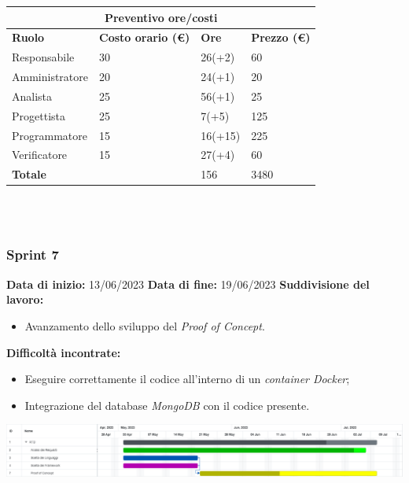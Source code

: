 \documentclass[a4paper, 12pt]{article}
\begin{document}
\begin{center}
	\begin{tabularx}{\textwidth}{|X|X|X|X|}
		\hline
		\multicolumn{4}{|c|}{\textbf{Preventivo ore/costi}}                                      \\
		\hline
		\hline
		\textbf{Ruolo}  & \textbf{Costo orario (\euro)} & \textbf{Ore} & \textbf{Prezzo (\euro)} \\
		\hline
		Responsabile    & 30                            & 26(+2)       & 60                      \\
		\hline
		Amministratore  & 20                            & 24(+1)       & 20                       \\
		\hline
		Analista        & 25                            & 56(+1)       & 25                       \\
		\hline
		Progettista     & 25                            & 7(+5)       & 125                     \\
		\hline
		Programmatore   & 15                            & 16(+15)      & 225                     \\
		\hline
		Verificatore    & 15                            & 27(+4)       & 60                      \\
		\hline
		\hline
		\textbf{Totale} &                               & 156          & 3480                    \\
		\hline
	\end{tabularx}\\[8pt]
	\mbox{}\\
\end{center}

\subsubsection{Sprint 7}
\textbf{Data di inizio:} 13/06/2023\newline
\textbf{Data di fine:} 19/06/2023\newline
\newline
\textbf{Suddivisione del lavoro:}
\begin{itemize}
    \item Avanzamento dello sviluppo del \textit{Proof of Concept}.
\end{itemize}
\textbf{Difficoltà incontrate:}
\begin{itemize}
    \item Eseguire correttamente il codice all'interno di un \textit{container Docker};
    \item Integrazione del database \textit{MongoDB} con il codice presente.
\end{itemize}
\includegraphics[scale=0.24]{RTB_6.png}\newline
\newline
\end{document}
